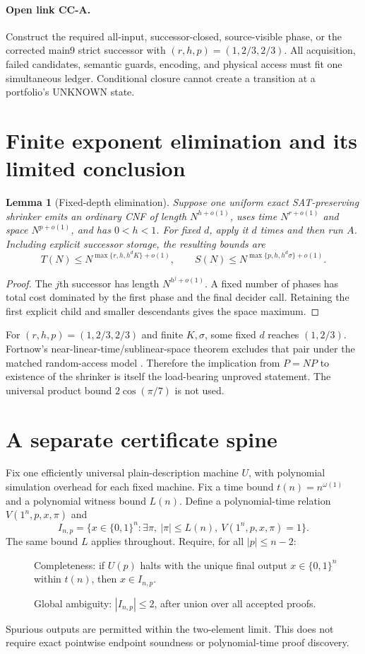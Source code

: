 \documentclass[11pt]{article}
\newtheorem{lemma}[theorem]{Lemma}
\begin{document}
\paragraph{Open link CC-A.} Construct the required all-input, successor-closed,
source-visible phase, or the corrected main9 strict successor with
$(r,h,p)=(1,2/3,2/3)$. All acquisition, failed candidates, semantic guards,
encoding, and physical access must fit one simultaneous ledger. Conditional
closure cannot create a transition at a portfolio's UNKNOWN state.

\section{Finite exponent elimination and its limited conclusion}
\begin{lemma}[Fixed-depth elimination]
Suppose one uniform exact SAT-preserving shrinker emits an ordinary CNF of
length $N^{h+o(1)}$, uses time $N^{r+o(1)}$ and space $N^{p+o(1)}$, and has
$0<h<1$. For fixed $d$, apply it $d$ times and then run $A$. Including explicit
successor storage, the resulting bounds are
\[
 T(N)\le N^{\max\{r,h,h^dK\}+o(1)},\qquad
 S(N)\le N^{\max\{p,h,h^d\sigma\}+o(1)}.
\]
\end{lemma}
\begin{proof}
The $j$th successor has length $N^{h^j+o(1)}$. A fixed number of phases has
total cost dominated by the first phase and the final decider call. Retaining
the first explicit child and smaller descendants gives the space maximum.
\end{proof}
For $(r,h,p)=(1,2/3,2/3)$ and finite $K,\sigma$, some fixed $d$ reaches
$(1,2/3)$. Fortnow's near-linear-time/sublinear-space theorem excludes that
pair under the matched random-access model \cite{fortnow2000}. Therefore
the implication from $P=NP$ to existence of the shrinker is itself the
load-bearing unproved statement. The universal product bound
$2\cos(\pi/7)$ is not used.

\section{A separate certificate spine}
Fix one efficiently universal plain-description machine $U$, with polynomial
simulation overhead for each fixed machine. Fix a time bound $t(n)=n^{\omega(1)}$
and a polynomial witness bound $L(n)$. Define a polynomial-time relation
$V(1^n,p,x,\pi)$ and
\[
 I_{n,p}=\{x\in\{0,1\}^n:\exists\pi,\ |\pi|\le L(n),\ V(1^n,p,x,\pi)=1\}.
\]
The same bound $L$ applies throughout. Require, for all $|p|\le n-2$:
\begin{description}
\item[] Completeness: if $U(p)$ halts with the unique final output
$x\in\{0,1\}^n$ within $t(n)$,
then $x\in I_{n,p}$.
\item[] Global ambiguity: $|I_{n,p}|\le2$, after union over all accepted proofs.
\end{description}
Spurious outputs are permitted within the two-element limit. This does not
require exact pointwise endpoint soundness or polynomial-time proof discovery.
\end{document}
